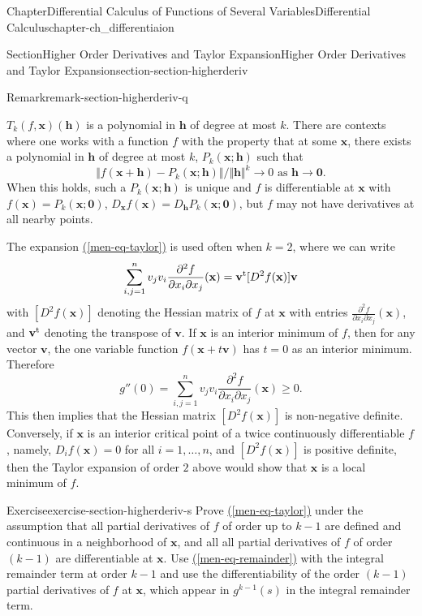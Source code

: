 \documentclass[oneside,10pt,]{book}
\newcommand{\xreffont}{\relax}
\numberwithin{equation}{section}
\newcommand{\bh}{\mathbf{h}}
\newcommand{\bv}{\mathbf{v}}
\newcommand{\bx}{\mathbf{x}}
\begin{document}
\begin{chapterptx}{Chapter}{Differential Calculus of Functions of Several Variables}{}{Differential Calculus}{}{}{chapter-ch_differentiaion}
\begin{sectionptx}{Section}{Higher Order Derivatives and Taylor Expansion}{}{Higher Order Derivatives and Taylor Expansion}{}{}{section-section-higherderiv}
\begin{remark}{Remark}{}{remark-section-higherderiv-q}
\par
\(T_{k}(f,\bx)(\bh)\) is a polynomial in \(\bh\) of degree at most \(k\). There are contexts where one works with a function \(f\) with the property that at some \(\bx\), there exists a polynomial in \(\bh\) of degree at most \(k\), \(P_{k}(\bx;\bh)\) such that%
\begin{equation}
\Vert f(\bx +\bh)-  P_{k}(\bx;\bh)\Vert/\Vert \bh \Vert^{k} \to 0 \text{ as $\bh \to \mathbf 0$}.\label{men-eq-ktaylor}
\end{equation}
When this holds, such a \(P_{k}(\bx;\bh)\) is unique and \(f\) is differentiable at \(\bx\) with \(f(\bx)=P_{k}(\bx; \mathbf 0)\), \(D_{\bx}f(\bx)=D_{\bh}P_{k}(\bx; \mathbf 0)\), but \(f\) may not have derivatives at all nearby points.%
\end{remark}
The expansion \hyperref[men-eq-taylor]{({\xreffont\ref{men-eq-taylor}})} is used often when \(k=2\), where we can write%
\begin{equation*}
\sum_{i, j=1}^{n} v_{j}v_{i}\frac{\partial^{2} f}{\partial x_{i}\partial x_{j}}(\bx)
=\bv^{\rm t}[D^{2}f(\bx)]\bv
\end{equation*}
with \([D^{2}f(\bx)]\) denoting the Hessian matrix of \(f\) at \(\bx\) with entries \(\frac{\partial^{2} f}{\partial x_{i}\partial x_{j}}(\bx)\), and \(\bv^{\rm t}\) denoting the transpose of \(\bv\). If \(\bx\) is an interior minimum of \(f\),  then for any vector \(\bv\), the one variable function \(f(\bx+t\bv)\) has \(t=0\) as an interior minimum. Therefore%
\begin{equation*}
g''(0)=\sum_{i, j=1}^{n} v_{j}v_{i}\frac{\partial^{2} f}{\partial x_{i}\partial x_{j}}(\bx) \ge 0.
\end{equation*}
This then implies that the Hessian matrix \([D^{2}f(\bx)]\) is non-negative definite. Conversely, if \(\bx\) is an interior critical point of a twice continuously differentiable \(f\), namely, \(D_{i}f(\bx)=0\) for all \(i=1,\ldots, n\), and \([D^{2}f(\bx)]\) is positive definite, then the Taylor expansion of order \(2\) above would show that \(\bx\) is a local minimum of \(f\).%
\begin{inlineexercise}{Exercise}{}{exercise-section-higherderiv-s}%
Prove \hyperref[men-eq-taylor]{({\xreffont\ref{men-eq-taylor}})} under the assumption that all partial derivatives of \(f\) of order up to \(k-1\) are defined and continuous in a neighborhood of \(\bx\), and all all partial derivatives of \(f\) of order  \((k-1)\) are differentiable at \(\bx\).%
\noindent\hypertarget{hint-section-higherderiv-s-b}{}Use \hyperref[men-eq-remainder]{({\xreffont\ref{men-eq-remainder}})} with the integral remainder term at order \(k-1\) and use the differentiability of the order \((k-1)\)  partial derivatives of \(f\) at \(\bx\), which appear in \(g^{k-1}(s)\) in the integral remainder term.\end{inlineexercise}%

\end{sectionptx}
\end{chapterptx}
\end{document}
